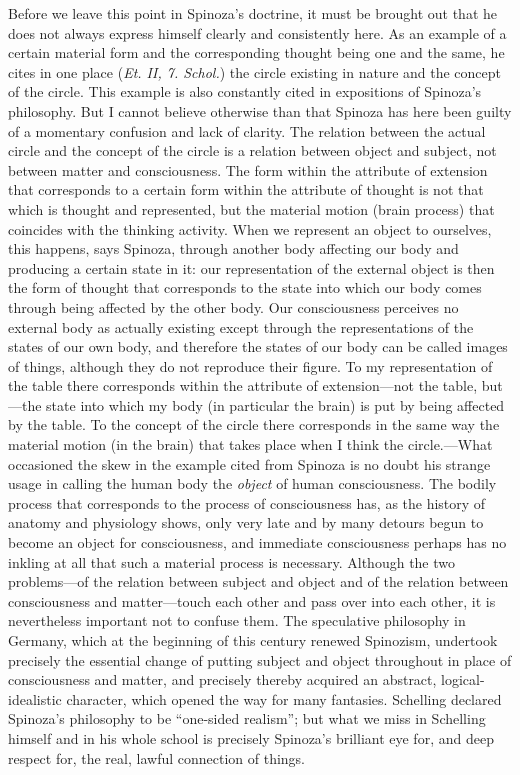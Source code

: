 \documentclass[12pt]{book}
\newcommand{\opage}[1]{\marginnote{\footnotesize\textit{[#1]}}}
\begin{document}
Before we leave this point in Spinoza's doctrine, it must be brought out that he does
not always express himself clearly and consistently here. As an example of a certain
material form and the corresponding thought being one and the same, he cites in one
place (\textit{Et. II, 7. Schol.}) the circle existing in nature and the concept of the
circle. This example is also constantly cited in expositions of Spinoza's philosophy.
But I cannot believe otherwise than that Spinoza has here been guilty of a momentary
confusion and lack of clarity. The relation between the actual circle and the concept
of the circle is a relation between object and subject, not between matter and
consciousness. The form within the attribute of extension that corresponds to a certain
form within the attribute of thought is not that which is thought and represented, but
the material motion (brain process) that coincides with the thinking activity. When we
represent an object to ourselves, this happens, says Spinoza, through another body
affecting our body and producing a certain state in it: our representation of the
external object is then the form of thought that corresponds to the state into which
our \opage{101}body comes through being affected by the other body. Our consciousness
perceives no external body as actually existing except through the representations of
the states of our own body, and therefore the states of our body can be called images of
things, although they do not reproduce their figure. To my representation of the table
there corresponds within the attribute of extension---not the table, but---the state into
which my body (in particular the brain) is put by being affected by the table. To the
concept of the circle there corresponds in the same way the material motion (in the
brain) that takes place when I think the circle.---What occasioned the skew in the
example cited from Spinoza is no doubt his strange usage in calling the human body the
\emph{object} of human consciousness. The bodily process that corresponds to the process
of consciousness has, as the history of anatomy and physiology shows, only very late and
by many detours begun to become an object for consciousness, and immediate consciousness
perhaps has no inkling at all that such a material process is necessary. Although the two
problems---of the relation between subject and object and of the relation between
consciousness and matter---touch each other and pass over into each other, it is
nevertheless important not to confuse them. The speculative philosophy in Germany, which
at the beginning of this century renewed Spinozism, undertook precisely the essential
change of putting subject and object throughout in place of consciousness and matter,
and precisely thereby acquired an abstract, logical-idealistic character, \opage{102}which
opened the way for many fantasies. Schelling declared Spinoza's philosophy to be
``one-sided realism''; but what we miss in Schelling himself and in his whole school is
precisely Spinoza's brilliant eye for, and deep respect for, the real, lawful connection
of things. %
\end{document}
